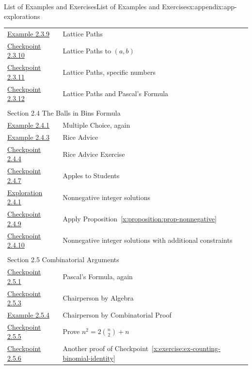 \documentclass[oneside,10pt,]{book}
\newcommand{\xreffont}{\relax}
\numberwithin{equation}{section}
\begin{document}
\begin{appendixptx}{List of Examples and Exercises}{}{List of Examples and Exercises}{}{}{x:appendix:app-explorations}
\begin{longtable}[l]{ll}
\hyperref[x:example:eg-counting-lattice-path]{Example 2.3.9}& Lattice Paths\\
\hyperref[x:exercise:ex-counting-lattice-1]{Checkpoint 2.3.10}& Lattice Paths to \((a,b)\)\\
\hyperref[x:exercise:ex-counting-lattice-2]{Checkpoint 2.3.11}& Lattice Paths, specific numbers\\
\hyperref[x:exercise:ex-counting-lattice-pascal]{Checkpoint 2.3.12}& Lattice Paths and Pascal's Formula\\
\multicolumn{2}{l}{\null}\\[1.5ex] \multicolumn{2}{l}{\large Section 2.4 The Balls in Bins Formula}\\[0.5ex]
\hyperref[x:example:eg-counting-mcq-again]{Example 2.4.1}& Multiple Choice, again\\
\hyperref[x:example:eg-counting-rice]{Example 2.4.3}& Rice Advice\\
\hyperref[x:exercise:ex-counting-rice-1]{Checkpoint 2.4.4}& Rice Advice Exercise\\
\hyperref[x:exercise:ex-counting-apples]{Checkpoint 2.4.7}& Apples to Students\\
\hyperref[x:exploration:eg-counting-nonnegative]{Exploration 2.4.1}& Nonnegative integer solutions\\
\hyperref[x:exercise:ex-counting-nonnegative-1]{Checkpoint 2.4.9}& Apply Proposition~{\xreffont\ref*{x:proposition:prop-nonnegative}}\\
\hyperref[x:exercise:ex-counting-nonnegative-2]{Checkpoint 2.4.10}& Nonnegative integer solutions with additional constraints\\
\multicolumn{2}{l}{\null}\\[1.5ex] \multicolumn{2}{l}{\large Section 2.5 Combinatorial Arguments}\\[0.5ex]
\hyperref[x:exercise:ex-counting-pascal-algebra]{Checkpoint 2.5.1}& Pascal's Formula, again\\
\hyperref[x:exercise:ex-chairperson-algebra]{Checkpoint 2.5.3}& Chairperson by Algebra\\
\hyperref[x:example:ex-chairperson-comb]{Example 2.5.4}& Chairperson by Combinatorial Proof\\
\hyperref[x:exercise:ex-counting-comb-proof-1]{Checkpoint 2.5.5}& Prove \(n^2 = 2\binom{n}{2} + n\)\\
\hyperref[x:exercise:ex-counting-comb-proof-2]{Checkpoint 2.5.6}& Another proof of Checkpoint~{\xreffont\ref*{x:exercise:ex-counting-binomial-identity}}\\

\end{longtable}
\end{appendixptx}
\end{document}
